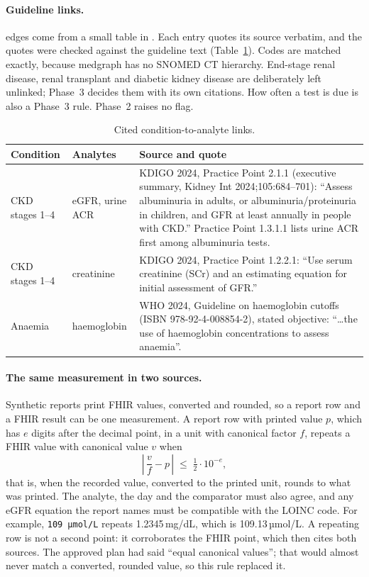 \documentclass[11pt,a4paper]{article}
\newcommand{\code}[1]{\texttt{\detokenize{#1}}}
\begin{document}
\paragraph{Guideline links.} \code{monitored_by} edges come from a small table in \code{rules/monitoring.py}. Each entry quotes its source verbatim, and the quotes were checked against the guideline text (Table~\ref{tab:monitor}). Codes are matched exactly, because medgraph has no SNOMED CT hierarchy. End-stage renal disease, renal transplant and diabetic kidney disease are deliberately left unlinked; Phase~3 decides them with its own citations. How often a test is due is also a Phase~3 rule. Phase~2 raises no flag.

\begin{table}[h]
\centering\footnotesize
\begin{tabularx}{\linewidth}{@{}>{\raggedright\arraybackslash}p{2.6cm}>{\raggedright\arraybackslash}p{2.4cm}>{\raggedright\arraybackslash}X@{}}
\toprule
Condition & Analytes & Source and quote \\
\midrule
CKD stages 1--4 & eGFR, urine ACR & KDIGO 2024, Practice Point 2.1.1 (executive summary, Kidney Int 2024;105:684--701): ``Assess albuminuria in adults, or albuminuria/proteinuria in children, and GFR at least annually in people with CKD.'' Practice Point 1.3.1.1 lists urine ACR first among albuminuria tests. \\
CKD stages 1--4 & creatinine & KDIGO 2024, Practice Point 1.2.2.1: ``Use serum creatinine (SCr) and an estimating equation for initial assessment of GFR.'' \\
Anaemia & haemoglobin & WHO 2024, Guideline on haemoglobin cutoffs (ISBN 978-92-4-008854-2), stated objective: ``\ldots the use of haemoglobin concentrations to assess anaemia''. \\
\bottomrule
\end{tabularx}
\caption{Cited condition-to-analyte links.}
\label{tab:monitor}
\end{table}

\paragraph{The same measurement in two sources.} Synthetic reports print FHIR values, converted and rounded, so a report row and a FHIR result can be one measurement. A report row with printed value $p$, which has $e$ digits after the decimal point, in a unit with canonical factor $f$, repeats a FHIR value with canonical value $v$ when
\[
\left|\, \frac{v}{f} - p \,\right| \;\le\; \tfrac12 \cdot 10^{-e},
\]
that is, when the recorded value, converted to the printed unit, rounds to what was printed. The analyte, the day and the comparator must also agree, and any eGFR equation the report names must be compatible with the LOINC code. For example, \texttt{109 µmol/L} repeats 1.2345\,mg/dL, which is 109.13\,µmol/L. A repeating row is not a second point: it corroborates the FHIR point, which then cites both sources. The approved plan had said ``equal canonical values''; that would almost never match a converted, rounded value, so this rule replaced it.
\end{document}
